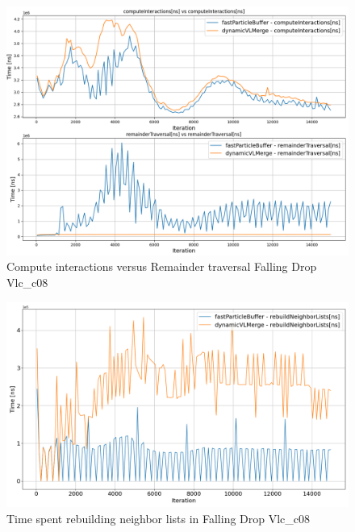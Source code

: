 \begin{figure}[htbp]
    \centering
        \includegraphics[width=0.9\linewidth]{graphs/fallingDrop/normalExperiments/freq/vlcc08inter156.png}
        \vspace{-0.5em}
        \caption{Compute interactions versus Remainder traversal Falling Drop Vlc\_c08}
        \label{fig:vlcc08inter156}
\end{figure}

\begin{figure}[htbp]
    \centering
        \includegraphics[width=0.9\linewidth]{graphs/fallingDrop/normalExperiments/freq/vlcc08_neighbour_156.png}
        \vspace{-0.5em}
        \caption{Time spent rebuilding neighbor lists in Falling Drop Vlc\_c08}
        \label{fig:vlcc08_neighbour_156}
\end{figure}

